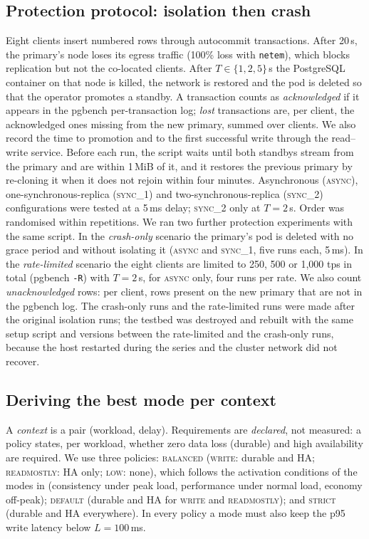 \documentclass[smallextended]{svjour3}
\begin{document}
\subsection{Protection protocol: isolation then crash}\label{sec:rpoproto}
Eight clients insert numbered rows through autocommit transactions. After 20\,s, the primary's node loses its egress traffic (100\% loss with \texttt{netem}), which blocks replication but not the co-located clients. After $T\in\{1,2,5\}$\,s the PostgreSQL container on that node is killed, the network is restored and the pod is deleted so that the operator promotes a standby. A transaction counts as \emph{acknowledged} if it appears in the pgbench per-transaction log; \emph{lost} transactions are, per client, the acknowledged ones missing from the new primary, summed over clients. We also record the time to promotion and to the first successful write through the read--write service. Before each run, the script waits until both standbys stream from the primary and are within 1\,MiB of it, and it restores the previous primary by re-cloning it when it does not rejoin within four minutes. Asynchronous (\textsc{async}), one-synchronous-replica (\textsc{sync\_1}) and two-synchronous-replica (\textsc{sync\_2}) configurations were tested at a 5\,ms delay; \textsc{sync\_2} only at $T=2$\,s. Order was randomised within repetitions. We ran two further protection experiments with the same script. In the \emph{crash-only} scenario the primary's pod is deleted with no grace period and without isolating it (\textsc{async} and \textsc{sync\_1}, five runs each, 5\,ms). In the \emph{rate-limited} scenario the eight clients are limited to 250, 500 or 1,000 tps in total (pgbench \texttt{-R}) with $T=2$\,s, for \textsc{async} only, four runs per rate. We also count \emph{unacknowledged} rows: per client, rows present on the new primary that are not in the pgbench log. The crash-only runs and the rate-limited runs were made after the original isolation runs; the testbed was destroyed and rebuilt with the same setup script and versions between the rate-limited and the crash-only runs, because the host restarted during the series and the cluster network did not recover.

\subsection{Deriving the best mode per context}\label{sec:labels}
A \emph{context} is a pair (workload, delay). Requirements are \emph{declared}, not measured: a policy states, per workload, whether zero data loss (durable) and high availability are required. We use three policies: \textsc{balanced} (\textsc{write}: durable and HA; \textsc{readmostly}: HA only; \textsc{low}: none), which follows the activation conditions of the modes in \cite{jerrari2026iaha} (consistency under peak load, performance under normal load, economy off-peak); \textsc{default} (durable and HA for \textsc{write} and \textsc{readmostly}); and \textsc{strict} (durable and HA everywhere). In every policy a mode must also keep the p95 write latency below $L=100$\,ms.
\end{document}
